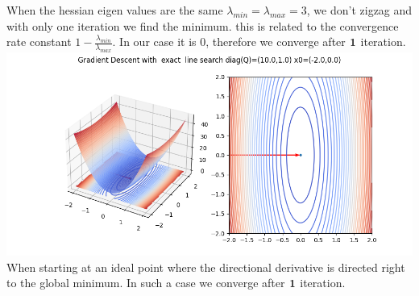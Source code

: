 \documentclass{article}
\begin{document}
When the hessian eigen values are the same $\lambda_{min} = \lambda_{max} = 3$, we don't zigzag and with only one iteration we find the minimum. this is related to the convergence rate constant $1 - \frac{\lambda_{min}}{\lambda_{max}}$. In our case it is 0, therefore we converge after $\bold{1}$ iteration.\\
\includegraphics[scale=0.5]{grad_descent_exact_3_elipse_easy_start_point.png}
When starting at an ideal point where the directional derivative is directed right to the global minimum. In such a case we converge after $\bold{1}$ iteration.\\
\end{document}
